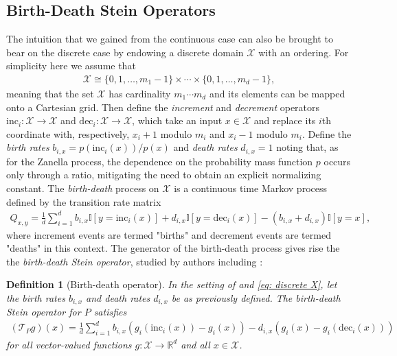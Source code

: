 \documentclass[12pt,paper=letter]{scrreprt}
\newtheorem{definition}{Definition}[chapter]
\def\mbb#1{\mathbb{#1}}
\def\reals{\mathbb{R}} %
\def\indic#1{\mbb{I}\left[{#1}\right]} %
\newcommand{\xset}[0]{\mathcal{X}} %
\newcommand{\TP}{\mathcal{T}_P}
\begin{document}
\subsection{Birth-Death Stein Operators}

The intuition that we gained from the continuous case can also be brought to bear on the discrete case by endowing a discrete domain $\xset$ with an ordering.
For simplicity here we assume that 
\begin{align}
\xset \cong \{0,1,\dots,m_1-1\} \times \cdots \times \{0,1,\dots,m_d - 1\} , \label{eq: discrete X}
\end{align}
meaning that the set $\xset$ has cardinality $m_1 \cdots m_d$ and its elements can be mapped onto a Cartesian grid.
Then define the \emph{increment} and \emph{decrement} operators $\mathrm{inc}_i : \xset \rightarrow \xset$ and $\mathrm{dec}_i : \xset \rightarrow \xset$, which take an input $x \in \xset$ and replace its $i$th coordinate with, respectively, $x_i + 1$ modulo $m_i$ and $x_i - 1$ modulo $m_i$.
Define the \emph{birth rates} $b_{i,x} = p(\mathrm{inc}_i(x)) / p(x)$ and \emph{death rates} $d_{i,x} = 1$ noting that, as for the Zanella process, the dependence on the probability mass function $p$ occurs only through a ratio, mitigating the need to obtain an explicit normalizing constant.
The \emph{birth-death} process on $\xset$ \citep{karlin1957classification} is a continuous time Markov process defined by the transition rate matrix 
\begin{align*}
	Q_{x,y} = \frac{1}{d}\sum_{i=1}^d
	b_{i,x} \indic{y = \mathrm{inc}_i(x)} 
	+ d_{i,x} \indic{y = \mathrm{dec}_i(x)} 
	- (b_{i,x}+d_{i,x}) \indic{y = x},
\end{align*}
where increment events are termed "births" and decrement events are termed "deaths" in this context.
 The generator of the birth-death process gives rise the the \emph{birth-death Stein operator}, studied by authors including \citet{brown2001stein,holmes2004stein,eichelsbacher2008stein,hodgkinson2020reproducing,shi2022gradient}:

\begin{definition}[Birth-death operator]
In the setting of  and \cref{eq: discrete X}, let the birth rates $b_{i,x}$ and death rates $d_{i,x}$ be as previously defined.
 The \emph{birth-death Stein operator} for $P$ satisfies
 \begin{align*}
     (\TP g)(x) = \frac{1}{d}\sum_{i=1}^d  b_{i,x}(g_i(\mathrm{inc}_i(x)) - g_i(x)) -  d_{i,x}(g_i(x) - g_i(\mathrm{dec}_i(x)))
 \end{align*}
 for all vector-valued functions $g : \xset \rightarrow \reals^d$ and all $x \in \xset$.
\end{definition}
\end{document}
